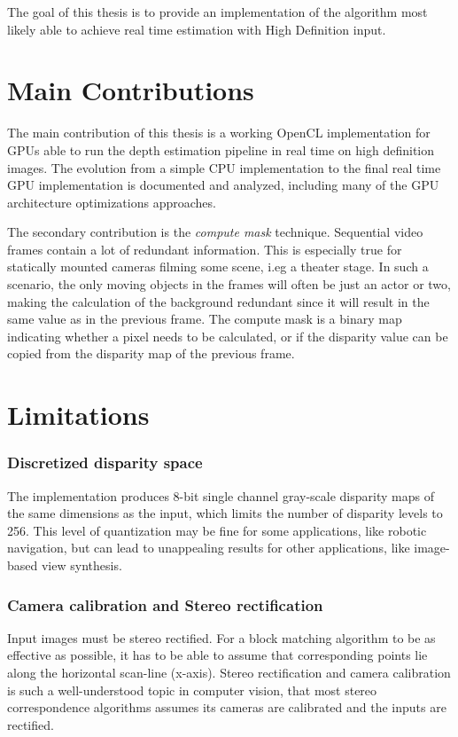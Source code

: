 The goal of this thesis is to provide an implementation of the
algorithm most likely able to achieve real time estimation with High
Definition input.


\section{Main Contributions}\label{sect:contributions}

The main contribution of this thesis is a working OpenCL
implementation for GPUs able to run the depth estimation pipeline in
real time on high definition images. The evolution from a simple CPU
implementation to the final real time GPU implementation is documented
and analyzed, including many of the GPU architecture optimizations
approaches.

The secondary contribution is the \textit{compute mask} technique.
Sequential video frames contain a lot of redundant information. This
is especially true for statically mounted cameras filming some scene,
i.eg a theater stage. In such a scenario, the only moving objects in
the frames will often be just an actor or two, making the calculation
of the background redundant since it will result in the same value as
in the previous frame. The compute mask is a binary map indicating
whether a pixel needs to be calculated, or if the disparity value can
be copied from the disparity map of the previous frame.

\section{Limitations}\label{sect:limitations}

\subsubsection{Discretized disparity space}

The implementation produces 8-bit single channel gray-scale disparity
maps of the same dimensions as the input, which limits the number of
disparity levels to 256. This level of quantization may be fine for
some applications, like robotic navigation, but can lead to
unappealing results for other applications, like image-based view
synthesis.

\subsubsection{Camera calibration and Stereo rectification}
Input images must be stereo rectified. For a block matching algorithm
to be as effective as possible, it has to be able to assume that
corresponding points lie along the horizontal scan-line
(x-axis). Stereo rectification and camera calibration is such a
well-understood topic in computer vision, that most stereo
correspondence algorithms assumes its cameras are calibrated and the
inputs are rectified. 

